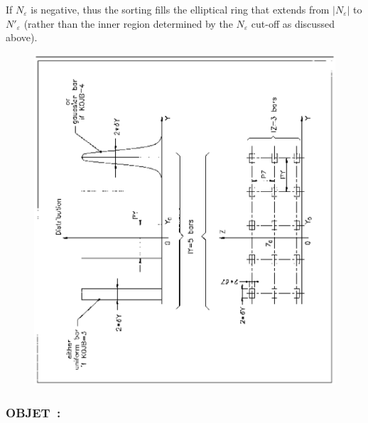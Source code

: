 \noindent If $N_\varepsilon$ is negative, thus the sorting fills the 
elliptical ring that extends from $\left| N_\varepsilon \right|$ to 
$N'_\varepsilon$ (rather than the inner region determined by the $N_\varepsilon$ 
cut-off as discussed above).


\vfill
 \begin{figure}[H]
\centerline{\includegraphics[width=15cm,angle=-90]{Fig5.ps}}  %
 \end{figure}
 \vfill 





\clearpage

 
\subsubsection{OBJET~:   \OBJETTitl} \label{OBJET} 
\medskip 
{}



